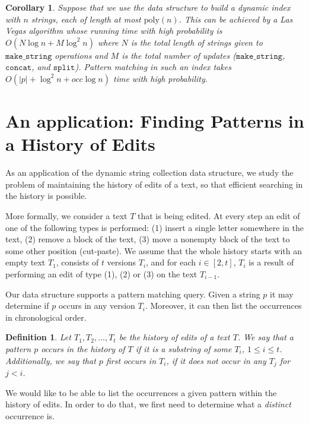 \documentclass[a4paper]{article}
\newenvironment{shortv}{}{}
\newtheorem{definition}[theorem]{Definition}
\newtheorem{corollary}[theorem]{Corollary}
\theoremstyle{remark}
\newcommand{\makeop}{\mathtt{make\_string}}
\newcommand{\concop}{\mathtt{concat}}
\newcommand{\splitop}{\mathtt{split}}
\newcommand{\poly}{\mathrm{poly}}
\begin{document}
\begin{corollary}\label{cor:persistent_index}
Suppose that we use the data structure to build  a dynamic index with $n$ strings, each of length at most $\poly(n)$.
This can be achieved by a Las Vegas algorithm whose running time with high probability is $O(N\log n +M\log^2 n)$ where $N$
is the total length of strings given to $\makeop$ operations and $M$ is the total number of updates ($\makeop$, $\concop$, and $\splitop$).
Pattern matching in such an index takes $O(|p|+\log^2 n + occ\log n)$ time with high probability.
\end{corollary}

\section{An application: Finding Patterns in a History of Edits}\label{sec:timeline}
As an application of the dynamic string collection data structure,
we study the problem of maintaining the history of
edits of a text, so that efficient searching in the history
is possible.

More formally, we consider a text $T$ that is being edited.
At every step an edit of one of the following types is performed:
   (1) insert a single letter somewhere in the text,
   (2) remove a block of the text,
   (3) move a nonempty block of the text to some other position (cut-paste).
We assume that the whole history starts with an empty text $T_1$,
consists of $t$ versions $T_i$, and for each $i\in [2,t]$, $T_i$ is
a result of performing an edit of type (1), (2) or (3) on the text
$T_{i-1}$.

\begin{shortv}
Our data structure supports a pattern matching query.
Given a string $p$ it may determine if $p$ occurs in any version $T_i$.
Moreover, it can then list the occurrences in chronological order.
\end{shortv}

\begin{definition}
Let $T_1,T_2,\ldots,T_t$ be the history of edits of a text $T$.
We say that a pattern $p$ occurs in the history of $T$
if it is a substring of some $T_i$, $1\leq i\leq t$.
Additionally, we say that $p$ first occurs in $T_i$, if
it does not occur in any $T_j$ for $j<i$.
\end{definition}

We would like to be able to list the occurrences a given pattern within the history of edits.
In order to do that, we first need to determine what a \emph{distinct}
occurrence is.
\end{document}
